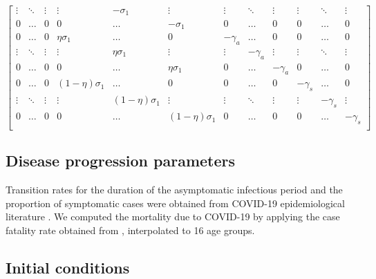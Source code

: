 \documentclass[10pt,onecolumn,twoside,lineno]{pnas-new}
\begin{document}
{\begin{equation}
\begin{bmatrix}
\vdots & \ddots & \vdots &\vdots & -\sigma_1  & \vdots & \vdots & \ddots  & \vdots & \vdots & \ddots & \vdots\\
0 & \dots & 0  & 0 & \dots &-\sigma_1   & 0 & \dots & 0 & 0 & \dots & 0 \\ 
0 & \dots & 0  & \eta\sigma_1  & \dots & 0  & -\gamma_a & \dots & 0  & 0 & \dots & 0  \\
\vdots & \ddots & \vdots & \vdots & \eta\sigma_1  & \vdots & \vdots &  -\gamma_a & \vdots & \vdots & \ddots & \vdots\\
0 & \dots & 0  & 0 & \dots &  \eta\sigma_1 & 0 & \dots &  -\gamma_a  & 0 & \dots & 0  \\ 
0 & \dots & 0  &   (1 - \eta)\sigma_1 & \dots & 0  &  0 & \dots & 0  &  -\gamma_s & \dots & 0  \\
\vdots & \ddots & \vdots & \vdots &  (1 - \eta)\sigma_1 & \vdots & \vdots & \ddots & \vdots & \vdots &  -\gamma_s & \vdots\\
0 & \dots & 0  &  0 & \dots & (1 - \eta)\sigma_1 & 0 & \dots & 0  & 0 & \dots &  -\gamma_s  \\ 
\end{bmatrix}
\label{Sigmaeqn}
\end{equation}}
\normalsize
\subsection*{Disease progression parameters}

Transition rates for the duration of the asymptomatic infectious period and the proportion of symptomatic cases were obtained from COVID-19 epidemiological literature \cite{nishiura2020serial,lauer2020incubation,tindale2020transmission}.  We computed the mortality due to COVID-19 by applying the case fatality rate obtained from \cite{publichealthontario}, interpolated to 16 age groups.

\subsection*{Initial conditions}
\end{document}
